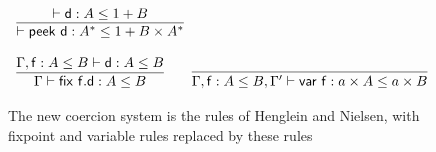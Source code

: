 \begin{figure}
\caption{The new coercion system is the rules of Henglein and Nielsen, with fixpoint and variable rules replaced by these rules}
\label{fig:system}
\centering
\begin{displaymath}
\begin{array}{lll}



\infer{\contains{}{\dslcom{peek}~d}{A^*}{1 + B \times A^*}}{\contains{}{d}{A}{1 + B}} \qquad
\\\\
\infer{\contains{\Gamma}{\fix ~f.d}{A}{B}}{ \contains{\Gamma, \dslcom{f}: A \leq B}{d}{A}{B}} \qquad
\infer{\contains{\Gamma, \mathsf{f} : A \leq B, \Gamma'}{var~f}{a \times A}{a \times B}}{}
\end{array}
\end{displaymath}
\end{figure}


